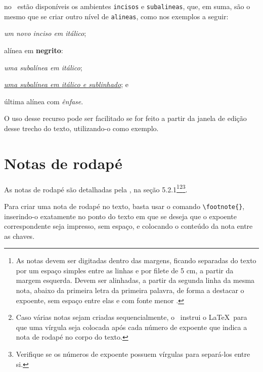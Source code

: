 \begin{alineas}
  \item no \abnTeX\ estão disponíveis os ambientes \texttt{incisos} e
  \texttt{subalineas}, que, em suma, são o mesmo que se criar outro nível de
  \texttt{alineas}, como nos exemplos a seguir:
  
  \begin{incisos}
    \item \textit{um novo inciso em itálico};
  \end{incisos}
  
  \item alínea em \textbf{negrito}:
  
  \begin{subalineas}
    \item \textit{uma subalínea em itálico};
    \item \underline{\textit{uma subalínea em itálico e sublinhado}}; e
  \end{subalineas}
  
  \item última alínea com \emph{ênfase}.
  
\end{alineas}

O uso desse recurso pode ser facilitado se for feito a partir da janela de edição desse trecho do texto, utilizando-o como exemplo.

\section{Notas de rodapé}

As notas de rodapé são detalhadas pela , na seção 5.2.1\footnote{As
notas devem ser digitadas dentro das margens, ficando separadas do texto por um espaço simples entre as linhas e por filete de 5 cm, a partir da margem esquerda. Devem ser alinhadas, a partir da segunda linha da mesma nota, abaixo da primeira letra da primeira palavra, de forma a destacar o expoente, sem espaço entre elas e com fonte menor \cite[seção 5.2.1]{NBR14724:2024}.}\footnote{Caso várias notas sejam
criadas sequencialmente, o \abnTeX\ instrui o \LaTeX\ para que uma vírgula seja
colocada após cada número de expoente que indica a nota de rodapé no corpo do
texto.}\footnote{Verifique se os números de expoente possuem vírgulas para
separá-los entre si.}.

Para criar uma nota de rodapé no texto, basta usar o comando \verb|\footnote{}|, inserindo-o exatamente no ponto do texto em que se deseja que o expoente correspondente seja impresso, sem espaço, e colocando o conteúdo da nota entre as chaves.

